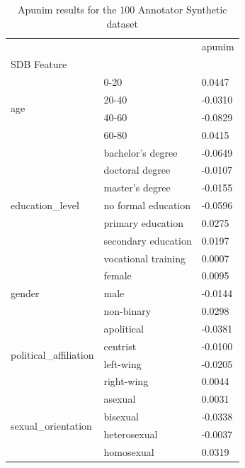 \begin{table}[t]
\caption{Apunim results for the 100 Annotator Synthetic dataset}
\label{tab:synthetic_100_apunim_only}
\begin{tabular}{lll}
\toprule
 &  & apunim \\
SDB Feature &  &  \\
\midrule
\multirow[t]{4}{*}{age} & 0-20 & 0.0447 \\
 & 20-40 & -0.0310 \\
 & 40-60 & -0.0829 \\
 & 60-80 & 0.0415 \\
\cline{1-3}
\multirow[t]{7}{*}{education\_level} & bachelor's degree & -0.0649 \\
 & doctoral degree & -0.0107 \\
 & master's degree & -0.0155 \\
 & no formal education & -0.0596 \\
 & primary education & 0.0275 \\
 & secondary education & 0.0197 \\
 & vocational training & 0.0007 \\
\cline{1-3}
\multirow[t]{3}{*}{gender} & female & 0.0095 \\
 & male & -0.0144 \\
 & non-binary & 0.0298 \\
\cline{1-3}
\multirow[t]{4}{*}{political\_affiliation} & apolitical & -0.0381 \\
 & centrist & -0.0100 \\
 & left-wing & -0.0205 \\
 & right-wing & 0.0044 \\
\cline{1-3}
\multirow[t]{4}{*}{sexual\_orientation} & asexual & 0.0031 \\
 & bisexual & -0.0338 \\
 & heterosexual & -0.0037 \\
 & homosexual & 0.0319 \\
\cline{1-3}
\bottomrule
\end{tabular}
\end{table}
